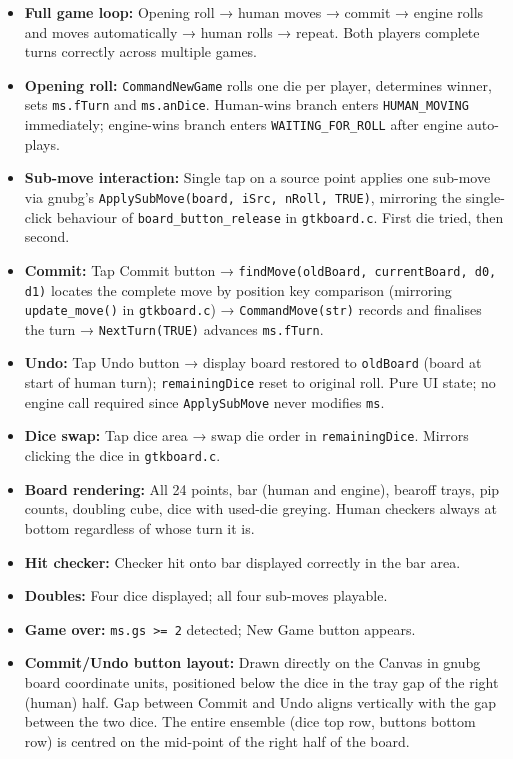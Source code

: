 \documentclass[11pt,a4paper]{article}
\providecommand{\tightlist}{\setlength{\itemsep}{2pt}\setlength{\parskip}{0pt}}
\begin{document}
\begin{itemize}
\tightlist
\item
  \textbf{Full game loop:} Opening roll → human moves → commit → engine
  rolls and moves automatically → human rolls → repeat. Both players
  complete turns correctly across multiple games.
\item
  \textbf{Opening roll:} \texttt{CommandNewGame} rolls one die per player,
  determines winner, sets \texttt{ms.fTurn} and \texttt{ms.anDice}.
  Human-wins branch enters \texttt{HUMAN\_MOVING} immediately; engine-wins
  branch enters \texttt{WAITING\_FOR\_ROLL} after engine auto-plays.
\item
  \textbf{Sub-move interaction:} Single tap on a source point applies one
  sub-move via gnubg's \texttt{ApplySubMove(board, iSrc, nRoll, TRUE)},
  mirroring the single-click behaviour of \texttt{board\_button\_release}
  in \texttt{gtkboard.c}. First die tried, then second.
\item
  \textbf{Commit:} Tap Commit button → \texttt{findMove(oldBoard,
  currentBoard, d0, d1)} locates the complete move by position key
  comparison (mirroring \texttt{update\_move()} in \texttt{gtkboard.c})
  → \texttt{CommandMove(str)} records and finalises the turn →
  \texttt{NextTurn(TRUE)} advances \texttt{ms.fTurn}.
\item
  \textbf{Undo:} Tap Undo button → display board restored to
  \texttt{oldBoard} (board at start of human turn); \texttt{remainingDice}
  reset to original roll. Pure UI state; no engine call required since
  \texttt{ApplySubMove} never modifies \texttt{ms}.
\item
  \textbf{Dice swap:} Tap dice area → swap die order in
  \texttt{remainingDice}. Mirrors clicking the dice in \texttt{gtkboard.c}.
\item
  \textbf{Board rendering:} All 24 points, bar (human and engine),
  bearoff trays, pip counts, doubling cube, dice with used-die greying.
  Human checkers always at bottom regardless of whose turn it is.
\item
  \textbf{Hit checker:} Checker hit onto bar displayed correctly in
  the bar area.
\item
  \textbf{Doubles:} Four dice displayed; all four sub-moves playable.
\item
  \textbf{Game over:} \texttt{ms.gs >= 2} detected; New Game button
  appears.
\item
  \textbf{Commit/Undo button layout:} Drawn directly on the Canvas in
  gnubg board coordinate units, positioned below the dice in the tray
  gap of the right (human) half. Gap between Commit and Undo aligns
  vertically with the gap between the two dice. The entire ensemble
  (dice top row, buttons bottom row) is centred on the mid-point of
  the right half of the board.
\end{itemize}
\end{document}
